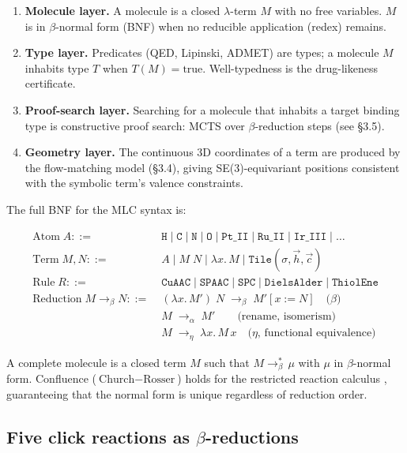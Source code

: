 \documentclass[10pt]{article}
\begin{document}
\begin{enumerate}
\[    \]
    Five rules are implemented (see \S3.2).
  \item \textbf{Molecule layer.}  A molecule is a closed $\lambda$-term
    $M$ with no free variables.  $M$ is in $\beta$-normal form (BNF) when
    no reducible application (redex) remains.
  \item \textbf{Type layer.}  Predicates (QED, Lipinski, ADMET) are types; a
    molecule $M$ inhabits type $T$ when $T(M)=\text{true}$.  Well-typedness is
    the drug-likeness certificate.
  \item \textbf{Proof-search layer.}  Searching for a molecule that inhabits a
    target binding type is constructive proof search: MCTS over $\beta$-reduction
    steps (see \S3.5).
  \item \textbf{Geometry layer.}  The continuous 3D coordinates of a term are
    produced by the flow-matching model (\S3.4), giving SE(3)-equivariant positions
    consistent with the symbolic term's valence constraints.
\end{enumerate}

The full BNF for the MLC syntax is:

{\small
\begin{align*}
\text{Atom} \; A ::=& \; \texttt{H} \mid \texttt{C} \mid \texttt{N} \mid \texttt{O}
       \mid \texttt{Pt\_II} \mid \texttt{Ru\_II} \mid \texttt{Ir\_III}
       \mid \dots \\[2mm]
\text{Term} \; M,N ::=& \; A \mid M\;N \mid \lambda x.\,M
       \mid \texttt{Tile}(\sigma,\vec{h},\vec{c}) \\[2mm]
\text{Rule} \; R ::=& \; \texttt{CuAAC} \mid \texttt{SPAAC} \mid \texttt{SPC}
       \mid \texttt{DielsAlder} \mid \texttt{ThiolEne} \\[2mm]
\text{Reduction} \; M \to_\beta N ::=& \;
       (\lambda x.\,M')\;N \;\to_\beta\; M'[x:=N] \quad\text{($\beta$)} \\
      &\; M \;\to_\alpha\; M' \qquad\text{(rename, isomerism)} \\
      &\; M \;\to_\eta\; \lambda x.\,M\,x \quad\text{($\eta$, functional equivalence)}
\end{align*}
}

A complete molecule is a closed term $M$ such that $M\to_\beta^*\,\mu$ with
$\mu$ in $\beta$-normal form.  Confluence ($\text{Church$-$Rosser}$) holds for
the restricted reaction calculus \cite{barendregt1984lambda}, guaranteeing that
the normal form is unique regardless of reduction order.

\subsection{Five click reactions as $\beta$-reductions}
\end{document}
